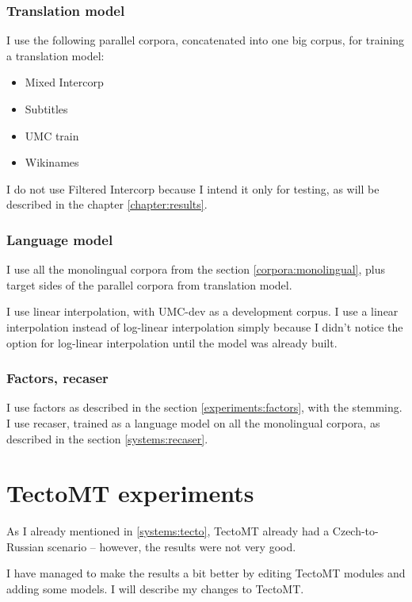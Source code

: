 \subsubsection{Translation model}
I use the following parallel corpora, concatenated into one big  corpus, for training a translation model:

\begin{itemize}
\item Mixed Intercorp
\item Subtitles
\item UMC train
\item Wikinames
\end{itemize}

I do not use Filtered Intercorp because I intend it only for testing, as will be described in the chapter \ref{chapter:results}.

\subsubsection{Language model}

I use all the monolingual corpora from the section \ref{corpora:monolingual}, plus target sides of the parallel corpora from translation model.

I use linear interpolation, with UMC-dev as a development corpus. I use a linear interpolation instead of log-linear interpolation simply because I didn't notice the option for log-linear interpolation until the model was already built.

\subsubsection{Factors, recaser}
I use factors as described in the section \ref{experiments:factors}, with the  stemming. I use recaser, trained as a language model on all the monolingual corpora, as described in the section \ref{systems:recaser}.


\section{TectoMT experiments}
\label{experiments:tecto}
As I already mentioned in \ref{systems:tecto}, TectoMT already had a Czech-to-Russian scenario -- however, the results were not very good.

I have managed to make the results a bit better by editing TectoMT modules and adding some models. I will describe my changes to TectoMT.

